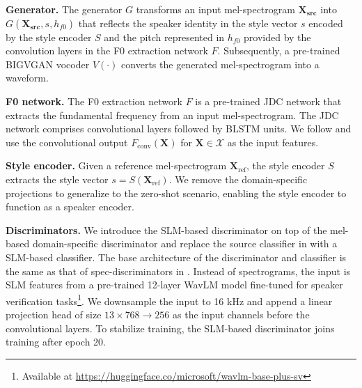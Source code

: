 \documentclass{article}
\newcommand{\footurl}[1]{\begingroup\urlstyle{same}\url{#1}\endgroup}
\begin{document}
\begin{sloppy}
\noindent\textbf{Generator.} The generator $G$ transforms an input mel-spectrogram $\bm{X_{\text{src}}}$ into $G(\bm{X_{\text{src}}}, s, h_{f0})$ that reflects the speaker identity in the style vector $s$ encoded by the style encoder $S$ and the pitch represented in $h_{f0}$ provided by the convolution layers in the F0 extraction network $F$. Subsequently, a pre-trained BIGVGAN \cite{lee2022bigvgan} vocoder $V(\cdot)$ converts the generated mel-spectrogram into a waveform.

\noindent\textbf{F0 network.} The F0 extraction network $F$ is a pre-trained JDC network \cite{kum2019joint} that extracts the fundamental frequency from an input mel-spectrogram. The JDC network comprises convolutional layers followed by BLSTM units. We follow \cite{li2021starganv2} and use the convolutional output $F_{\text{conv}}(\bm{X})$ for $\bm{X} \in \mathcal{X}$ as the input features.

\noindent\textbf{Style encoder.} Given a reference mel-spectrogram $\bm{X}_{\text{ref}}$, the style encoder $S$ extracts the style vector $s = S(\bm{X}_{\text{ref}})$. We remove the domain-specific projections to generalize to the zero-shot scenario, enabling the style encoder to function as a speaker encoder. 
   
\noindent\textbf{Discriminators.} We introduce the SLM-based discriminator on top of the mel-based domain-specific discriminator and replace the source  classifier in \cite{li2021starganv2} with a SLM-based classifier. The base architecture of the discriminator and classifier is the same as that of spec-discriminators in \cite{lee2022bigvgan}. Instead of spectrograms, the input is SLM features from a pre-trained 12-layer WavLM \cite{chen2022wavlm} model fine-tuned for speaker verification tasks\footnote{Available at \mbox{\footurl{https://huggingface.co/microsoft/wavlm-base-plus-sv}}}. We downsample the input to 16 kHz and append a linear projection head of size $13 \times 768 \rightarrow 256$ as the input channels before the convolutional layers. To stabilize training, the SLM-based discriminator joins training after epoch 20.


\end{sloppy}
\end{document}
